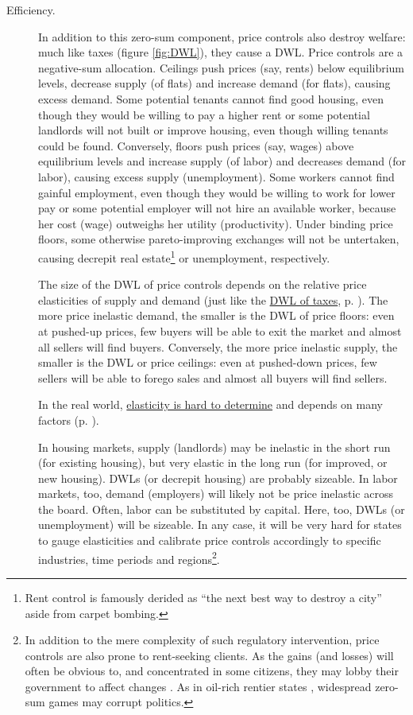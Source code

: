 \begin{description}
	\item[Efficiency.] 
		In addition to this zero-sum component, price controls also destroy welfare: much like taxes (figure \ref{fig:DWL}), they cause a \gls{DWL}.  Price controls are a negative-sum allocation. Ceilings push prices (say, rents) below equilibrium levels, decrease supply (of flats) and increase demand (for flats), causing excess demand. Some potential tenants cannot find good housing, even though they would be willing to pay a higher rent or some potential landlords will not built or improve housing, even though willing tenants could be found. Conversely, floors push prices (say, wages) above equilibrium levels and increase supply (of labor) and decreases demand (for labor), causing excess supply (unemployment). Some workers cannot find gainful employment, even though they would be willing to work for lower pay or some potential employer will not hire an available worker, because her cost (wage) outweighs her utility (productivity). Under binding price floors, some otherwise pareto-improving exchanges will not be untertaken, causing decrepit real estate\footnote{
			Rent control is famously derided as ``the next best way to destroy a city'' aside from carpet bombing.} 
		or unemployment, respectively. 
	
		The size of the \gls{DWL} of price controls depends on the relative price elasticities of supply and demand (just like the \hyperref[sec:minimalDWL]{\gls{DWL} of taxes}, p. \pageref{sec:minimalDWL}).
		The more price inelastic demand, the smaller is the \gls{DWL} of price floors: even at pushed-up prices, few buyers will be able to exit the market and almost all sellers will find buyers. Conversely, the more price inelastic supply, the smaller is the \gls{DWL} or price ceilings: even at pushed-down prices, few sellers will be able to forego sales and almost all buyers will find sellers. 
	
		In the real world, \hyperref[sec:well-determinedincidence]{elasticity is hard to determine} and depends on many factors (p. \pageref{sec:well-determinedincidence}). 
	
		In housing markets, supply (landlords) may be inelastic in the short run (for existing housing), but very elastic in the long run (for improved, or new housing). \glspl{DWL} (or decrepit housing) are probably sizeable. In labor markets, too, demand (employers) will likely not be price inelastic across the board. Often, labor can be substituted by capital. Here, too, \glspl{DWL} (or unemployment) will be sizeable. In any case, it will be very hard for states to gauge elasticities and calibrate price controls accordingly to specific industries, time periods and regions\footnote{
			In addition to the mere complexity of such regulatory intervention, price controls are also prone to rent-seeking clients. As the gains (and losses) will often be obvious to, and concentrated in some citizens, they may lobby their government to affect changes \citep{Peltzman1976,Posner1975,Krueger1974}. As in oil-rich rentier states \citep{Beblawi1990}, widespread zero-sum games may corrupt politics.}.
		

\end{description}
